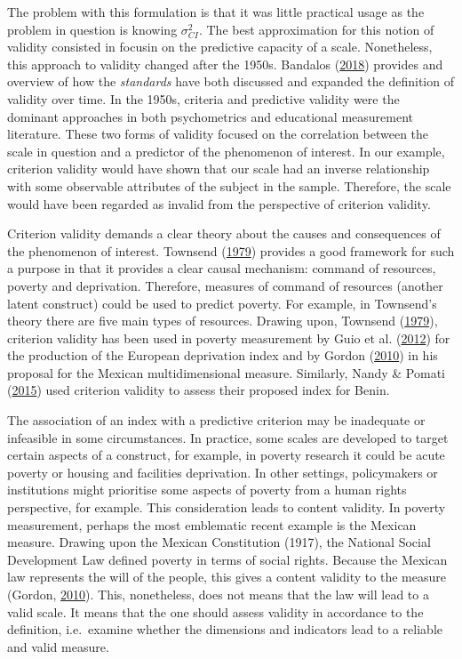 \documentclass[]{book}
\begin{document}
The problem with this formulation is that it was little practical usage as the problem in question is knowing \(\sigma^2_{CI}\). The best approximation for this notion of validity consisted in focusin on the predictive capacity of a scale. Nonetheless, this approach to validity changed after the 1950s. Bandalos (\protect\hyperlink{ref-Bandalos2018}{2018}) provides and overview of how the \emph{standards} have both discussed and expanded the definition of validity over time. In the 1950s, criteria and predictive validity were the dominant approaches in both psychometrics and educational measurement literature. These two forms of validity focused on the correlation between the scale in question and a predictor of the phenomenon of interest. In our example, criterion validity would have shown that our scale had an inverse relationship with some observable attributes of the subject in the sample. Therefore, the scale would have been regarded as invalid from the perspective of criterion validity.

Criterion validity demands a clear theory about the causes and consequences of the phenomenon of interest. Townsend (\protect\hyperlink{ref-Townsend1979}{1979}) provides a good framework for such a purpose in that it provides a clear causal mechanism: command of resources, poverty and deprivation. Therefore, measures of command of resources (another latent construct) could be used to predict poverty. For example, in Townsend's theory there are five main types of resources. Drawing upon, Townsend (\protect\hyperlink{ref-Townsend1979}{1979}), criterion validity has been used in poverty measurement by Guio et al. (\protect\hyperlink{ref-Guio2012}{2012}) for the production of the European deprivation index and by Gordon (\protect\hyperlink{ref-Gordon2010}{2010}) in his proposal for the Mexican multidimensional measure. Similarly, Nandy \& Pomati (\protect\hyperlink{ref-Nandy2015}{2015}) used criterion validity to assess their proposed index for Benin.

The association of an index with a predictive criterion may be inadequate or infeasible in some circumstances. In practice, some scales are developed to target certain aspects of a construct, for example, in poverty research it could be acute poverty or housing and facilities deprivation. In other settings, policymakers or institutions might prioritise some aspects of poverty from a human rights perspective, for example. This consideration leads to content validity. In poverty measurement, perhaps the most emblematic recent example is the Mexican measure. Drawing upon the Mexican Constitution (1917), the National Social Development Law defined poverty in terms of social rights. Because the Mexican law represents the will of the people, this gives a content validity to the measure (Gordon, \protect\hyperlink{ref-Gordon2010}{2010}). This, nonetheless, does not means that the law will lead to a valid scale. It means that the one should assess validity in accordance to the definition, i.e.~examine whether the dimensions and indicators lead to a reliable and valid measure.
\end{document}

